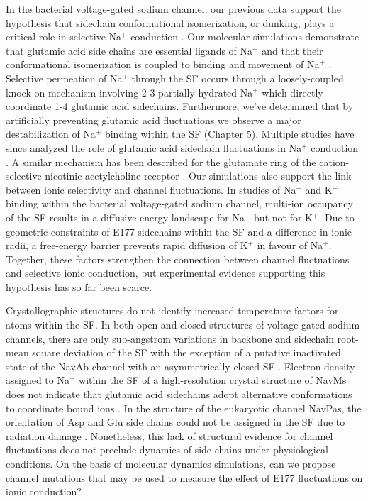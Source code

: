 \begin{refsection}
In the bacterial voltage-gated sodium channel, our previous data support the hypothesis that sidechain conformational isomerization, or dunking, plays a critical role in selective Na$^+$ conduction \cite{Chakrabarti:2013kd}. Our molecular simulations demonstrate that glutamic acid side chains are essential ligands of Na$^+$ and that their conformational isomerization is coupled to binding and movement of Na$^+$ \cite{Chakrabarti:2013kd}. Selective permeation of Na$^+$ through the SF occurs through a loosely-coupled knock-on mechanism involving 2-3 partially hydrated Na$^+$ which directly coordinate 1-4 glutamic acid sidechains. Furthermore, we've determined that by artificially preventing glutamic acid fluctuations we observe a major destabilization of Na$^+$ binding within the SF (Chapter 5). Multiple studies have since analyzed the role of glutamic acid sidechain fluctuations in Na$^+$ conduction \cite{Ke:2014fy,Boiteux:2014ut,Domene:2015kj,Furini:2014gv}. A similar mechanism has been described for the glutamate ring of the cation-selective nicotinic acetylcholine receptor \cite{Harpole:2014gu}. Our simulations also support the link between ionic selectivity and channel fluctuations. In studies of Na$^+$ and K$^+$ binding within the bacterial voltage-gated sodium channel, multi-ion occupancy of the SF results in a diffusive energy landscape for Na$^+$ but not for K$^+$. Due to geometric constraints of E177 sidechains within the SF and a difference in ionic radii, a free-energy barrier prevents rapid diffusion of K$^+$ in favour of Na$^+$. Together, these factors strengthen the connection between channel fluctuations and selective ionic conduction, but experimental evidence supporting this hypothesis has so far been scarce.

Crystallographic structures do not identify increased temperature factors for atoms within the SF. In both open and closed structures of voltage-gated sodium channels, there are only sub-angstrom variations in backbone and sidechain root-mean square deviation of the SF \cite{Sula:2017jx,Sula:2017hu,Lenaeus:2017cy} with the exception of a putative inactivated state of the NavAb channel with an asymmetrically closed SF \cite{Payandeh:2013ex}. Electron density assigned to Na$^+$ within the SF of a high-resolution crystal structure of NavMs does not indicate that glutamic acid sidechains adopt alternative conformations to coordinate bound ions \cite{Naylor:2016cu}. In the structure of the eukaryotic channel NavPas, the orientation of Asp and Glu side chains could not be assigned in the SF due to radiation damage \cite{Shen:2017df}. Nonetheless, this lack of structural evidence for channel fluctuations does not preclude dynamics of side chains under physiological conditions. On the basis of molecular dynamics simulations, can we propose channel mutations that may be used to measure the effect of E177 fluctuations on ionic conduction?


\end{refsection}
